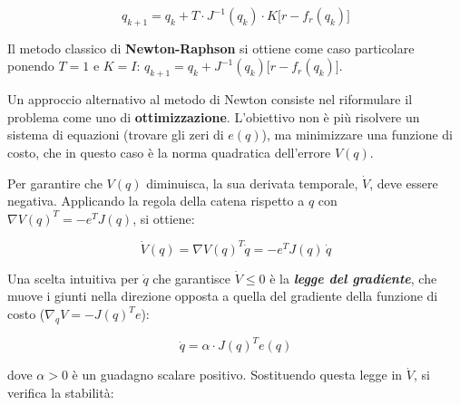 \documentclass[11pt, a4paper]{article}
\begin{document}
\label{H_1dd8}
\[
    q_{k+1} = q_k + T \cdot J^{-1}(q_k) \cdot K\bigl\lbrack r - f_r(q_k) \bigr\rbrack
\]

\begin{par}
\begin{flushleft}
Il metodo classico di \textbf{Newton-Raphson} si ottiene come caso particolare ponendo $T=1$ e $K=I$: $q_{k+1} =q_k +J^{-1} (q_k )\bigl\lbrack r-f_r (q_k )\bigr\rbrack$.
\end{flushleft}
\end{par}

\newpage
{}

\begin{par}
\begin{flushleft}
Un approccio alternativo al metodo di Newton consiste nel riformulare il problema come uno di \textbf{ottimizzazione}. L'obiettivo non è più risolvere un sistema di equazioni (trovare gli zeri di $e(q)$), ma minimizzare una funzione di costo, che in questo caso è la norma quadratica dell'errore $V(q)$.
\end{flushleft}
\end{par}

\begin{par}
\begin{flushleft}
Per garantire che $V(q)$ diminuisca, la sua derivata temporale, $\dot{V}$, deve essere negativa. Applicando la regola della catena rispetto a $q$ con $\nabla V(q)^T =-e^T J(q)$, si ottiene:
\end{flushleft}
\end{par}

\label{H_46dd}
\[
    \dot{V}(q) = \nabla V(q)^T \dot{q} = -e^T J(q)\,\dot{q}
\]

\begin{par}
\begin{flushleft}
Una scelta intuitiva per $\dot{q}$ che garantisce $\dot{V} \le 0$ è la \textit{\textbf{legge del gradiente}}, che muove i giunti nella direzione opposta a quella del gradiente della funzione di costo ($\nabla_q V=-J(q)^T e$):
\end{flushleft}
\end{par}

\label{H_0d42}
\[
    \dot{q} = \alpha \cdot J(q)^T e(q)
\]

\begin{par}
\begin{flushleft}
dove $\alpha >0$ è un guadagno scalare positivo. Sostituendo questa legge in $\dot{V}$, si verifica la stabilità:
\end{flushleft}
\end{par}
\end{document}
